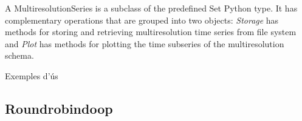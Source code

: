 A MultiresolutionSeries is a subclass of the predefined Set Python
type. It has complementary operations that are grouped into two
objects: \emph{Storage} has methods for storing and retrieving
multiresolution time series from file system and \emph{Plot} has
methods for plotting the time subseries of the multiresolution schema.




\todo{}


Exemples d'ús



\subsection{Roundrobindoop}

\todo{}




